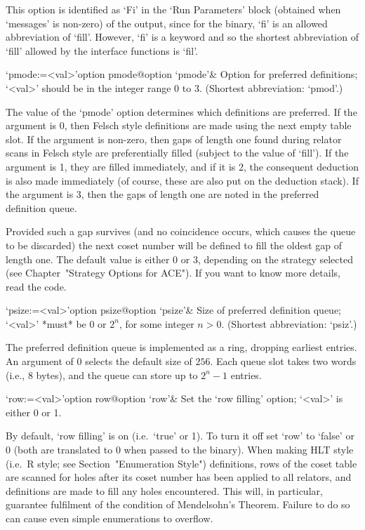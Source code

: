 This option is identified as `Fi' in the  \lq{}Run  Parameters'  block
(obtained when `messages' is non-zero) of the {\ACE} output, since for
the {\ACE} binary, `fi' is an allowed abbreviation of `fill'. However,
`fi' is a {\GAP} keyword and so the shortest  abbreviation  of  `fill'
allowed by the interface functions is `fil'.

\>`pmode:=<val>'{option pmode}@{option `pmode'}&
Option for preferred definitions; `<val>' should  be  in  the  integer
range 0 to 3. (Shortest abbreviation: `pmod'.)

The  value of  the  `pmode' option  determines  which definitions  are
preferred.  If  the argument is  0, then Felsch style  definitions are
made using  the next empty table  slot.  If the  argument is non-zero,
then gaps of length one found during relator scans in Felsch style are
preferentially  filled  (subject to  the  value  of  `fill').  If  the
argument  is 1,  they are  filled  immediately, and  if it  is 2,  the
consequent deduction  is also made  immediately (of course,  these are
also put on the deduction stack).  If the argument is 3, then the gaps
of length one are noted in the preferred definition queue.

Provided such a gap survives (and no coincidence occurs, which  causes
the queue to be discarded) the next coset number will  be  defined  to
fill the oldest gap of length one. The default value is either 0 or 3,
depending on the strategy selected (see Chapter~"Strategy Options  for
ACE"). If you want to know more details, read the code.


\>`psize:=<val>'{option psize}@{option `psize'}&
Size of preferred definition queue; `<val>' *must* be 0 or $2^n$,  for
some integer $n>0$. (Shortest abbreviation: `psiz'.)

The  preferred definition  queue is  implemented as  a  ring, dropping
earliest entries. An argument of 0 selects  the default size of $256$.
Each  queue slot takes two words (i.e., 8 bytes),  and the  queue  can
store up to $2^n-1$ entries.

\enditems


\beginitems

\>`row:=<val>'{option row}@{option `row'}&
Set the \lq{}row filling' option; `<val>' is either 0 or 1.

By default, \lq{}row filling' is on (i.e.~`true' or 1). To turn it off
set `row' to `false' or 0 (both are translated to 0 when passed to the
{\ACE}  binary).  When   making   HLT   style   (i.e.~R   style;   see
Section~"Enumeration Style") definitions, rows of the coset table  are
scanned for holes after its coset  number  has  been  applied  to  all
relators, and definitions are made to fill any holes encountered. This
will,  in  particular,  guarantee  fulfilment  of  the  condition   of
Mendelsohn's  Theorem.  Failure  to  do  so  can  cause  even   simple
enumerations to overflow.

